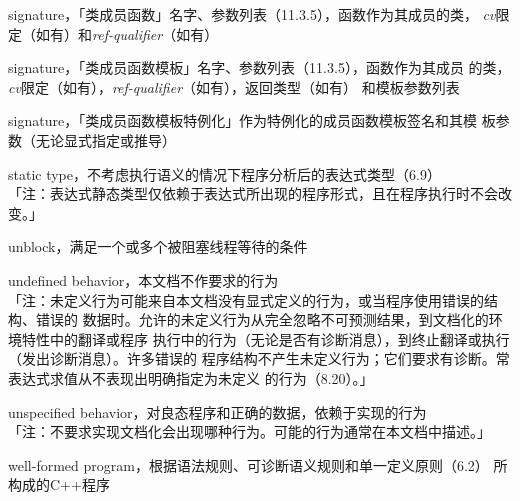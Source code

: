 \noindent signature，「类成员函数」名字、参数列表（11.3.5），函数作为其成员的类，
\textit{cv}限定（如有）和\textit{ref-qualifier}（如有）

\noindent signature，「类成员函数模板」名字、参数列表（11.3.5），函数作为其成员
的类，\textit{cv}限定（如有），\textit{ref-qualifier}（如有），返回类型（如有）
和模板参数列表

\noindent signature，「类成员函数模板特例化」作为特例化的成员函数模板签名和其模
板参数（无论显式指定或推导）

\noindent static type，不考虑执行语义的情况下程序分析后的表达式类型（6.9） \\
「注：表达式静态类型仅依赖于表达式所出现的程序形式，且在程序执行时不会改变。」

\noindent unblock，满足一个或多个被阻塞线程等待的条件

\noindent undefined behavior，本文档不作要求的行为 \\
「注：未定义行为可能来自本文档没有显式定义的行为，或当程序使用错误的结构、错误的
数据时。允许的未定义行为从完全忽略不可预测结果，到文档化的环境特性中的翻译或程序
执行中的行为（无论是否有诊断消息），到终止翻译或执行（发出诊断消息）。许多错误的
程序结构不产生未定义行为；它们要求有诊断。常表达式求值从不表现出明确指定为未定义
的行为（8.20）。」

\noindent unspecified behavior，对良态程序和正确的数据，依赖于实现的行为 \\
「注：不要求实现文档化会出现哪种行为。可能的行为通常在本文档中描述。」

\noindent well-formed program，根据语法规则、可诊断语义规则和单一定义原则（6.2）
所构成的C++程序

